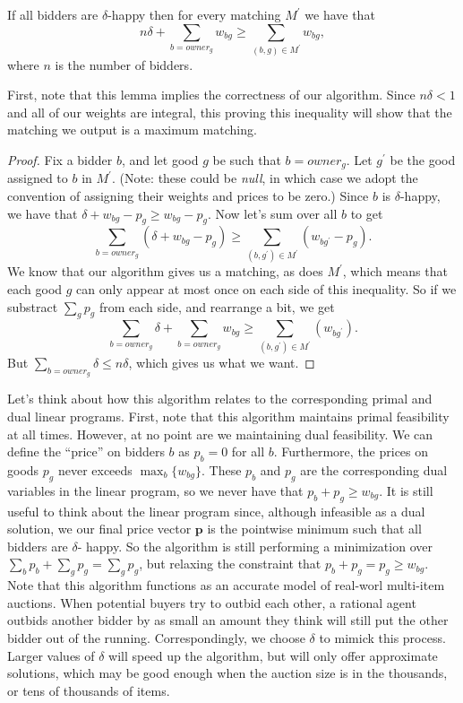 \documentclass[11pt]{article}
\renewcommand{\'}{^{'}}
\newenvironment{lemma}[2][Lemma]{\begin{trivlist}
\item[\hskip \labelsep {\bfseries #1}\hskip \labelsep {\bfseries #2.}]}{\end{trivlist}}
\begin{document}
\begin{lemma}{}
	If all bidders are $\delta$-happy then for every matching $M\'$ we have that 
	\[
		n\delta + \sum_{b = owner_g} w_{bg} \geq \sum_{(b,g)\in M\'} w_{bg},
	\]
	where $n$ is the number of bidders. 
\end{lemma}

First, note that this lemma implies the correctness of our algorithm. Since $n\delta < 1$ and all of 
our weights are integral, this proving this inequality will show that the matching we output is 
a maximum matching.

\begin{proof}
	Fix a bidder $b$, and let good $g$ be such that $b = owner_g$. Let $g\'$ be the good assigned 
	to $b$ in $M\'$. (Note: these could be \emph{null}, in which case we adopt the convention of 
	assigning their weights and prices to be zero.) Since $b$ is $\delta$-happy, we have that 
	$\delta + w_{bg} - p_g \geq w_{bg} - p_g$. Now let's sum over all $b$ to get 
	\[
		\sum_{b=owner_g} (\delta + w_{bg} - p_g) \geq \sum_{(b,g\')\in M\'} (w_{bg\'} - p_g).
	\]
	We know that our algorithm gives us a matching, as does $M\'$, which means that each good $g$ 
	can only appear at most once on each side of this inequality. So if we substract $\sum_g p_g$ 
	from each side, and rearrange a bit, we get 
	\[
		\sum_{b=owner_g} \delta + \sum_{b=owner_g} w_{bg} \geq \sum_{(b,g\')\in M\'} (w_{bg\'}). 
	\]
	But $\sum_{b=owner_g} \delta \leq n\delta$, which gives us what we want.
\end{proof}

Let's think about how this algorithm relates to the corresponding primal and dual linear programs. 
First, note that this algorithm maintains primal feasibility at all times. However, at no point are we 
maintaining dual feasibility. We can define the ``price'' on bidders $b$ as $p_b = 0$ for all $b$. 
Furthermore, the prices on goods $p_g$ never exceeds $\max_{b} \{w_{bg}\}$. These $p_b$ and $p_g$ are 
the corresponding dual variables in the linear program, so we never have that $p_b + p_g \geq w_{bg}$. 
It is still useful to think about the linear program since, although infeasible as a dual solution, 
we our final price vector $\mathbf{p}$ is the pointwise minimum such that all bidders are $\delta$-
happy. So the algorithm is still performing a minimization over $\sum_b p_b + \sum_g p_g = \sum_g p_g$, 
but relaxing the constraint that $p_b + p_g = p_g \geq w_{bg}$.\\
Note that this algorithm functions as an accurate model of real-worl multi-item auctions. When potential 
buyers try to outbid each other, a rational agent outbids another bidder by as small an amount they 
think will still put the other bidder out of the running. Correspondingly, we choose $\delta$ to mimick 
this process. Larger values of $\delta$ will speed up the algorithm, but will only offer approximate 
solutions, which may be good enough when the auction size is in the thousands, or tens of thousands of 
items.
\end{document}
